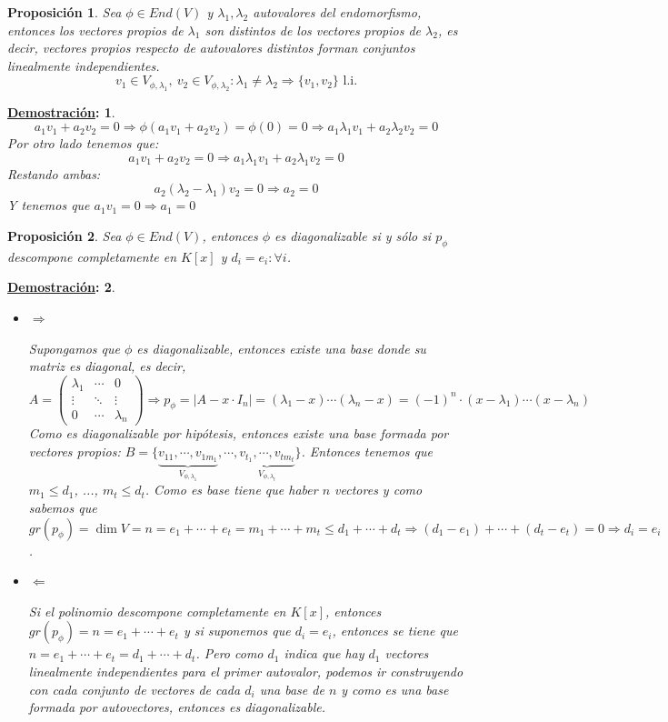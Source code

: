 \documentclass[10pt,a4paper,openright]{book}
\theoremstyle{break}
\newtheorem*{prop}{Proposición}
\newtheorem*{demo}{\underline{Demostración}:}
\begin{document}
\begin{prop}
Sea $\phi \in End(V)$ y $\lambda_1, \lambda_2$ autovalores del endomorfismo, entonces los vectores propios de $\lambda_1$ son distintos de los vectores propios de $\lambda_2$, es decir, vectores propios respecto de autovalores distintos forman conjuntos linealmente independientes.
$$v_1\in V_{\phi, \lambda_1},\ v_2\in V_{\phi,\lambda_2}: \lambda_1 \neq \lambda_2 \Rightarrow \{v_1,v_2\}\mbox{ l.i.}$$
\end{prop}
\begin{demo}
$$a_1v_1+a_2v_2=0\Rightarrow \phi(a_1v_1+a_2v_2)=\phi(0)=0\Rightarrow a_1\lambda_1v_1+a_2\lambda_2v_2=0$$
Por otro lado tenemos que:
$$a_1v_1+a_2v_2=0\Rightarrow a_1\lambda_1v_1+a_2\lambda_1v_2=0$$
Restando ambas:
$$a_2(\lambda_2-\lambda_1)v_2=0\Rightarrow a_2=0$$
Y tenemos que $a_1v_1=0\Rightarrow a_1=0$
\end{demo}

\begin{prop}
Sea $\phi\in End(V)$, entonces $\phi$ es diagonalizable si y sólo si $p_\phi$ descompone completamente en $K[x]$ y $d_i=e_i:\forall i$.
\end{prop}
\begin{demo}
\begin{itemize}
\item $\Rightarrow$

Supongamos que $\phi$ es diagonalizable, entonces existe una base donde su matriz es diagonal, es decir,
$$A=\begin{pmatrix}\lambda_1 &\cdots &0\\ \vdots &\ddots & \vdots\\ 0 &\cdots &\lambda_n\end{pmatrix} \Rightarrow p_\phi = |A-x\cdot I_n|=(\lambda_1-x)\cdots (\lambda_n-x)=(-1)^n\cdot (x-\lambda_1)\cdots (x-\lambda_n)$$
Como es diagonalizable por hipótesis, entonces existe una base formada por vectores propios: $B=\{\underbrace{v_{11}, \cdots, v_{1m_1}}_{V_{\phi,\lambda_1}}, \cdots,\underbrace{v_{t_1}, \cdots, v_{tm_t}}_{V_{\phi,\lambda_t}}\}$. Entonces tenemos que $m_1\leq d_1$, ..., $m_t\leq d_t$. Como es base tiene que haber $n$ vectores y como sabemos que $gr(p_\phi)=\dim V = n= e_1+\cdots+e_t=m_1+\cdots+m_t\leq d_1+\cdots+d_t\Rightarrow (d_1-e_1)+\cdots+(d_t-e_t)=0\Rightarrow d_i=e_i$.

\item $\Leftarrow$

Si el polinomio descompone completamente en $K[x]$, entonces $gr(p_\phi)=n = e_1+\cdots+e_t$ y si suponemos que $d_i=e_i$, entonces se tiene que $n=e_1+\cdots+e_t=d_1+\cdots+d_t$. Pero como $d_1$ indica que hay $d_1$ vectores linealmente independientes para el primer autovalor, podemos ir construyendo con cada conjunto de vectores de cada $d_i$ una base de $n$ y como es una base formada por autovectores, entonces es diagonalizable.
\end{itemize}
\end{demo}
\end{document}
